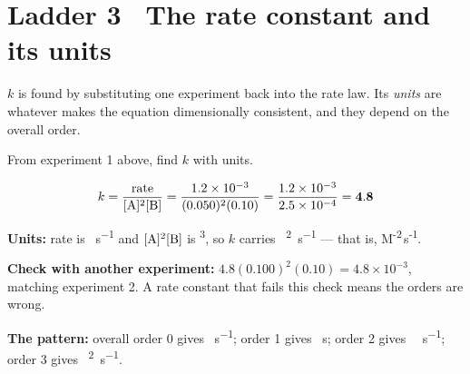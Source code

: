 \documentclass{apchem-worksheet}
\begin{document}
\section*{\sffamily Ladder 3 \textbullet\ The rate constant and its units}

$k$ is found by substituting one experiment back into the rate law. Its
\emph{units} are whatever makes the equation dimensionally consistent, and
they depend on the overall order.

\begin{workedexample}
From experiment 1 above, find $k$ with units.

\[ k = \frac{\text{rate}}{[\ce{A}]^2[\ce{B}]}
     = \frac{1.2\times10^{-3}}{(0.050)^2(0.10)}
     = \frac{1.2\times10^{-3}}{2.5\times10^{-4}} = \mathbf{4.8} \]

\textbf{Units:} rate is \si{\Molar\per\second} and
$[\ce{A}]^2[\ce{B}]$ is \si{\Molar\cubed}, so $k$ carries
\si{\per\Molar\squared\per\second} --- that is,
M\textsuperscript{-2}\,s\textsuperscript{-1}.

\textbf{Check with another experiment:}
$4.8(0.100)^2(0.10) = 4.8\times10^{-3}$, matching experiment 2.
\checkmark A rate constant that fails this check means the orders are
wrong.

\textbf{The pattern:} overall order 0 gives \si{\Molar\per\second}; order
1 gives \si{\per\second}; order 2 gives
\si{\per\Molar\per\second}; order 3 gives
\si{\per\Molar\squared\per\second}.
\end{workedexample}
\end{document}
